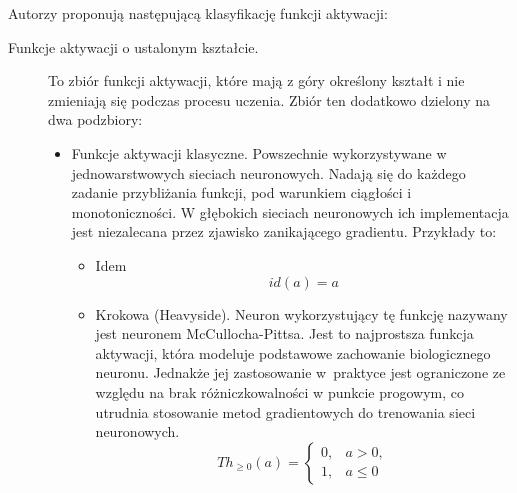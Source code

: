 Autorzy \cite{fa_survey} 
proponują następującą klasyfikację funkcji aktywacji:
\begin{description}
    \item [Funkcje aktywacji o ustalonym kształcie.] To zbiór funkcji aktywacji, które mają z góry określony kształt i nie zmieniają się podczas procesu uczenia. Zbiór ten dodatkowo dzielony na dwa podzbiory:
        \begin{itemize}
            \item Funkcje aktywacji klasyczne. Powszechnie wykorzystywane w jednowarstwowych sieciach neuronowych. Nadają się do każdego zadanie przybliżania funkcji, pod warunkiem ciągłości i monotoniczności. W głębokich sieciach neuronowych ich implementacja jest niezalecana przez zjawisko zanikającego gradientu. Przykłady to:
                \begin{itemize}
                    \item Idem \[id(a) = a\]
                    \item Krokowa (Heavyside). Neuron wykorzystujący tę funkcję nazywany jest neuronem McCullocha-Pittsa. Jest to najprostsza funkcja aktywacji, która modeluje podstawowe zachowanie biologicznego neuronu. Jednakże jej zastosowanie w~praktyce jest ograniczone ze względu na brak różniczkowalności w punkcie progowym, co utrudnia stosowanie metod gradientowych do trenowania sieci neuronowych. \cite{haykin2009neural}
                     \[Th_{\geq 0}(a) = \begin{cases}
                                                                0, & a>0, \\
                                                                1, & a \leq 0
                                                            \end{cases}
                                                            \]


\end{itemize}
\end{itemize}
\end{description}

